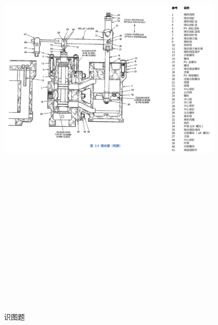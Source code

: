 \documentclass{book}
\begin{document}
\begin{figure}[htbp]
\centering
\includegraphics[width=600pt,height=700pt,keepaspectratio,angle=90,origin=c]{picture/1Tjidongqi.png}
\caption{识图题}
\end{figure}
		\ifx \allfiles \undefined
\end{document}
